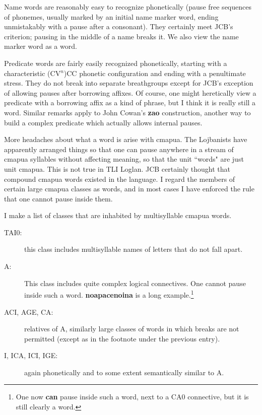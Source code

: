 \documentclass[12pt]{book}
\begin{document}
{Name words are reasonably easy to recognize phonetically (pause free sequences of phonemes, usually marked by an initial name marker word, ending
unmistakably with a pause after a consonant).  They certainly meet JCB's criterion; pausing in the middle of a name breaks it.   We also view the name marker word as a word.

Predicate words are fairly easily recognized phonetically, starting with a characteristic (CV$^n$)CC phonetic configuration and ending with a penultimate stress.  They do not break into separate breathgroups except for JCB's exception of allowing pauses after borrowing affixes.  Of course, one might heretically view a predicate with a borrowing affix as a kind of phrase, but I think it is really still a word.   Similar remarks apply to 
John Cowan's {\bf zao} construction, another way to build a complex predicate which actually allows internal pauses.

More headaches about what a word is arise with cmapua.   The Lojbanists have apparently arranged things so that one can pause anywhere in a stream of cmapua syllables without affecting meaning, so that the unit ``words" are just unit cmapua.  This is not true in TLI Loglan.   JCB certainly thought that compound cmapua words existed in the language.  I regard the members of certain large cmapua classes as words, and in most cases
I have enforced the rule that one cannot pause inside them.  

I make a list of classes that are inhabited by multisyllable cmapua words.

\begin{description}

\item[TAI0:]  this class includes multisyllable names of letters that do not fall apart.

\item[A:]  This class includes quite complex logical connectives.  One cannot pause inside such a word.  {\bf noapacenoina} is a long example.\footnote{One now {\bf can} pause inside such a word, next to a CA0 connective, but it is still clearly a word.}

\item[ACI, AGE, CA:]  relatives of A, similarly large classes of words in which breaks are not permitted (except as in the footnote under the previous entry).

\item[I, ICA, ICI, IGE:]  again phonetically and to some extent semantically similar to A.


\end{description}}
\end{document}
